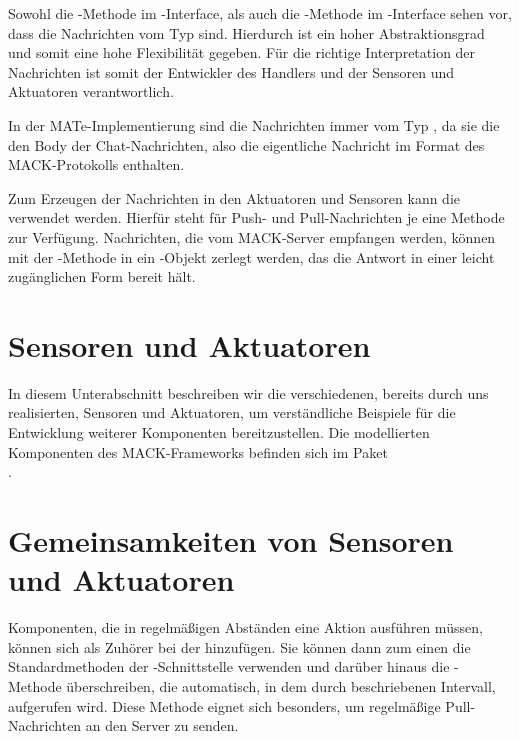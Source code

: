 Sowohl die -Methode im -Interface, als auch die -Methode im -Interface sehen vor, dass die Nachrichten vom Typ  sind. Hierdurch ist ein hoher Abstraktionsgrad und somit eine hohe Flexibilität gegeben. Für die richtige Interpretation der Nachrichten ist somit der Entwickler des Handlers und der Sensoren und Aktuatoren verantwortlich.

In der MATe-Implementierung sind die Nachrichten immer vom Typ , da sie die den Body der Chat-Nachrichten, also die eigentliche Nachricht im Format des MACK-Protokolls enthalten.

Zum Erzeugen der Nachrichten in den Aktuatoren und Sensoren kann die  verwendet werden. Hierfür steht für Push- und Pull-Nachrichten je eine Methode zur Verfügung. Nachrichten, die vom MACK-Server empfangen werden, können mit der -Methode in ein -Objekt zerlegt werden, das die Antwort in einer leicht zugänglichen Form bereit hält.

\section{Sensoren und Aktuatoren}\label{subsec:real_sensors}
In diesem Unterabschnitt beschreiben wir die verschiedenen, bereits durch uns realisierten, Sensoren und Aktuatoren, um verständliche Beispiele für die Entwicklung weiterer Komponenten bereitzustellen. Die modellierten Komponenten des MACK-Frameworks befinden sich im Paket \\.

\section{Gemeinsamkeiten von Sensoren und Aktuatoren}
Komponenten, die in regelmäßigen Abständen eine Aktion ausführen müssen, können sich als Zuhörer bei der  hinzufügen. Sie können dann zum einen die Standardmethoden der -Schnittstelle verwenden und darüber hinaus die  -Methode überschreiben, die automatisch, in dem durch  beschriebenen Intervall, aufgerufen wird. Diese Methode eignet sich besonders, um regelmäßige Pull-Nachrichten an den Server zu senden.


